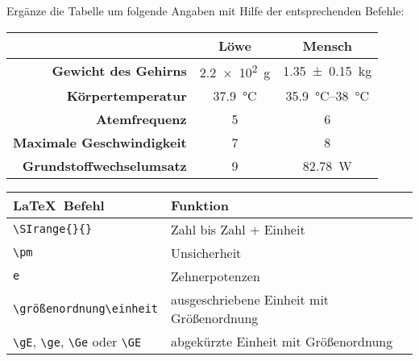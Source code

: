\documentclass["WS\space 16-17\space -\space LaTeX-Kurs\space -\space Praesentation\space -\space 3.tex"]{subfiles}
\begin{document}
\begin{frame}[fragile]
	\vspace{-0.3cm}
	\begin{Aufgabe}
		Ergänze die Tabelle um folgende Angaben mit Hilfe der entsprechenden Befehle:
	\end{Aufgabe}
	\begin{outputbox}
		\begin{center}
			\begin{tabular}{r|cc}
				\hline
				&	\textbf{Löwe}										& \textbf{Mensch} 						\\ \hline 
				\textbf{Gewicht des Gehirns}		&	\SI{2.2 e2}{\g}										& \SI{1.35 \pm 0.15}{\kg}				\\ 
				\textbf{Körpertemperatur}			&	\SI{37.9}{\degreeCelsius}							& \SIrange{35.9}{38}{\degreeCelsius}	\\
				\textbf{Atemfrequenz}				&	5								& 6					\\
				\textbf{Maximale Geschwindigkeit}	&	7								& 8				\\ 
				\textbf{Grundstoffwechselumsatz}	&	9	&  \SI{82.78}{\watt}\\
				\hline
			\end{tabular}
		\end{center}
	\end{outputbox}

	\begin{center}
	\begin{tabular}{ll}
		\toprule
		\LaTeX\ Befehl						&	Funktion									\\ \midrule
		\lstinline|\SIrange{}{}|			&	Zahl bis Zahl + Einheit						\\
		\lstinline|\pm			|			&	Unsicherheit								\\		
		\lstinline|e			|			&	Zehnerpotenzen						\\		
		\lstinline|\größenordnung\einheit|	&	ausgeschriebene Einheit	mit Größenordnung	\\
		\lstinline|\gE|, \lstinline|\ge|, \lstinline|\Ge| oder \lstinline|\GE|&	abgekürzte Einheit mit Größenordnung		\\
		\bottomrule
	\end{tabular}
\end{center}
	\vspace{0.1cm}
\end{frame}
\end{document}

